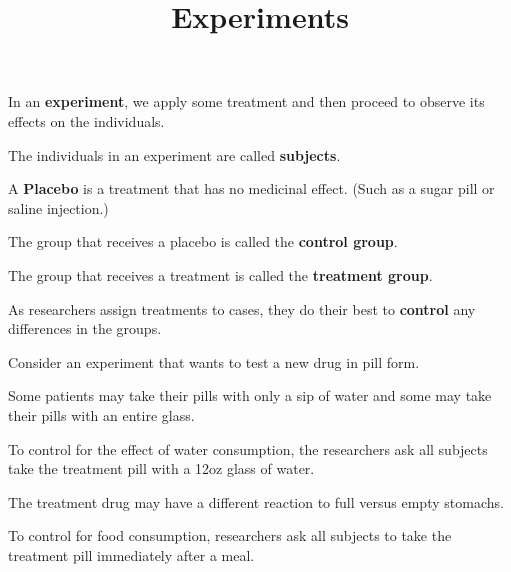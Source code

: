\documentclass{beamer}
\title[MA205 - Section 1.4]{Experiments}
\begin{document}
\begin{frame}
\titlepage
\end{frame}

\begin{frame}
\begin{definition}
In an \textbf{experiment}, we apply some treatment and then proceed to observe its effects on the individuals.
\end{definition}\pause

\begin{definition}
The individuals in an experiment are called \textbf{subjects}.
\end{definition}\pause

\begin{definition}
A \textbf{Placebo} is a treatment that has no medicinal effect. (Such as a sugar pill or saline injection.)
\end{definition}\pause

\begin{definition}
The group that receives a placebo is called the \textbf{control group}.
\end{definition}\pause

\begin{definition}
The group that receives a treatment is called the \textbf{treatment group}.
\end{definition}
\end{frame}

\begin{frame}
\begin{definition}
As researchers assign treatments to cases, they do their best to \textbf{control} any differences in the groups.
\end{definition}\pause

\begin{example}
Consider an experiment that wants to test a new drug in pill form.\pause

\vspace{2mm}
Some patients may take their pills with only a sip of water and some may take their pills with an entire glass.\pause

\vspace{2mm}
To control for the effect of water consumption, the researchers ask all subjects take the treatment pill with a 12oz glass of water.\pause

\vspace{2mm}
The treatment drug may have a different reaction to full versus empty stomachs.\pause

\vspace{2mm}
To control for food consumption, researchers ask all subjects to take the treatment pill immediately after a meal.
\end{example}
\end{frame}
\end{document}
